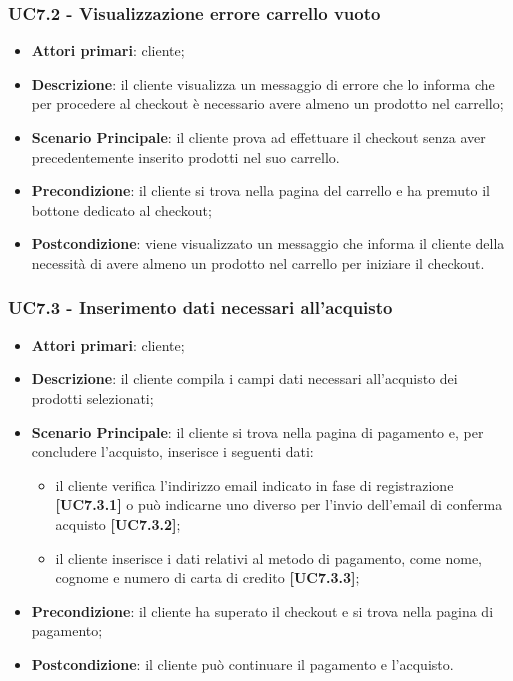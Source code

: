 \subsubsection{UC7.2 - Visualizzazione errore carrello vuoto}
\begin{itemize}
\item \textbf{Attori primari}: cliente;
\item \textbf{Descrizione}: il cliente visualizza un messaggio di errore che lo informa che per procedere al checkout è necessario avere almeno un prodotto nel carrello;
\item \textbf{Scenario Principale}: il cliente prova ad effettuare il checkout senza aver precedentemente inserito prodotti nel suo carrello.
\item \textbf{Precondizione}: il cliente si trova nella pagina del carrello e ha premuto il bottone dedicato al checkout;
\item \textbf{Postcondizione}: viene visualizzato un messaggio che informa il cliente della necessità di avere almeno un prodotto nel carrello per iniziare il checkout.
\end{itemize}

\subsubsection{UC7.3 - Inserimento dati necessari all'acquisto}
\begin{itemize}
\item \textbf{Attori primari}: cliente;
\item \textbf{Descrizione}: il cliente compila i campi dati necessari all'acquisto dei prodotti selezionati;
\item \textbf{Scenario Principale}: il cliente si trova nella pagina di pagamento e, per concludere l'acquisto, inserisce i seguenti dati:
\begin{itemize}
	\item il cliente verifica l'indirizzo email indicato in fase di registrazione \textbf{[UC7.3.1]} o può indicarne uno diverso per l'invio dell'email di conferma acquisto \textbf{[UC7.3.2]};
	\item il cliente inserisce i dati relativi al metodo di pagamento, come nome, cognome e numero di carta di credito \textbf{[UC7.3.3]};
\end{itemize}
\item \textbf{Precondizione}: il cliente ha superato il checkout e si trova nella pagina di pagamento;
\item \textbf{Postcondizione}: il cliente può continuare il pagamento e l'acquisto.
\end{itemize}

